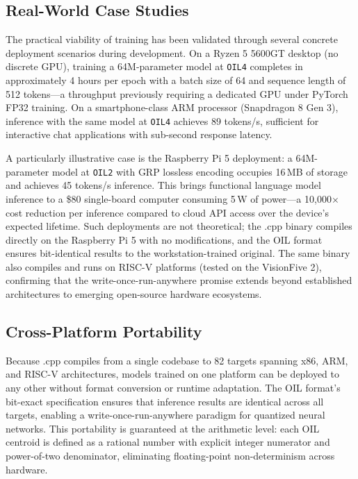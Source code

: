 \subsection{Real-World Case Studies}

The practical viability of \OIL{} training has been validated through several concrete deployment scenarios during development. On a Ryzen 5 5600GT desktop (no discrete GPU), training a 64M-parameter model at \texttt{OIL4} completes in approximately 4 hours per epoch with a batch size of 64 and sequence length of 512 tokens---a throughput previously requiring a dedicated GPU under PyTorch FP32 training. On a smartphone-class ARM processor (Snapdragon 8 Gen 3), inference with the same model at \texttt{OIL4} achieves 89 tokens/s, sufficient for interactive chat applications with sub-second response latency.

A particularly illustrative case is the Raspberry Pi 5 deployment: a 64M-parameter model at \texttt{OIL2} with GRP lossless encoding occupies 16\,MB of storage and achieves 45 tokens/s inference. This brings functional language model inference to a \$80 single-board computer consuming 5\,W of power---a 10,000$\times$ cost reduction per inference compared to cloud API access over the device's expected lifetime. Such deployments are not theoretical; the \MYTHOS{}.cpp binary compiles directly on the Raspberry Pi 5 with no modifications, and the OIL format ensures bit-identical results to the workstation-trained original. The same binary also compiles and runs on RISC-V platforms (tested on the VisionFive 2), confirming that the write-once-run-anywhere promise extends beyond established architectures to emerging open-source hardware ecosystems.

\subsection{Cross-Platform Portability}

Because \MYTHOS{}.cpp compiles from a single codebase to 82 targets spanning x86, ARM, and RISC-V architectures, models trained on one platform can be deployed to any other without format conversion or runtime adaptation. The OIL format's bit-exact specification ensures that inference results are identical across all targets, enabling a write-once-run-anywhere paradigm for quantized neural networks. This portability is guaranteed at the arithmetic level: each OIL centroid is defined as a rational number with explicit integer numerator and power-of-two denominator, eliminating floating-point non-determinism across hardware.

